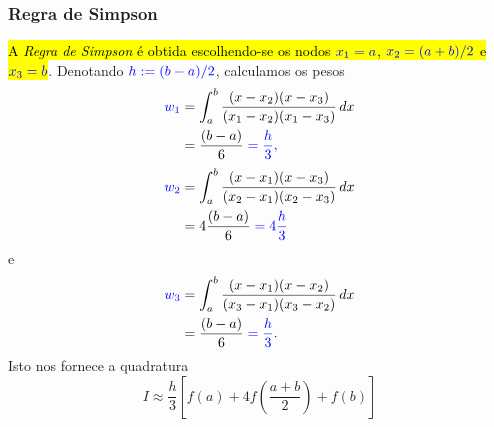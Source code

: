 \subsubsection{Regra de Simpson}

\hl{A \emph{Regra de Simpson}{\simpson} é obtida escolhendo-se os nodos $\color{blue}x_1=a$, $\color{blue}x_2=(a+b)/2$ e $\color{blue}x_3=b$}. Denotando $\color{blue}h:=(b-a)/2$, calculamos os pesos
\begin{subequations}
  \begin{align}
    \color{blue}w_1 &= \int_a^b\frac{(x-x_2)(x-x_3)}{(x_1-x_2)(x_1-x_3)}\,dx\\
        &= \frac{(b-a)}{6} \color{blue}= \frac{h}{3},
  \end{align}
\end{subequations}
\begin{subequations}
  \begin{align}
    \color{blue}w_2 &= \int_a^b\frac{(x-x_1)(x-x_3)}{(x_2-x_1)(x_2-x_3)}\,dx\\
        &= 4\frac{(b-a)}{6} \color{blue}= 4\frac{h}{3}
  \end{align}
\end{subequations}
e
\begin{align}
  \color{blue}w_3 &= \int_a^b\frac{(x-x_1)(x-x_2)}{(x_3-x_1)(x_3-x_2)}\,dx\\
  &= \frac{(b-a)}{6} \color{blue}= \frac{h}{3}.
\end{align}
Isto nos fornece a quadratura
\begin{equation}\label{cap_integr_sec_nc:eq:aux_Simpson}
  I \approx \frac{h}{3}\left[f(a) + 4f\left(\frac{a+b}{2}\right) + f(b)\right]
\end{equation}

